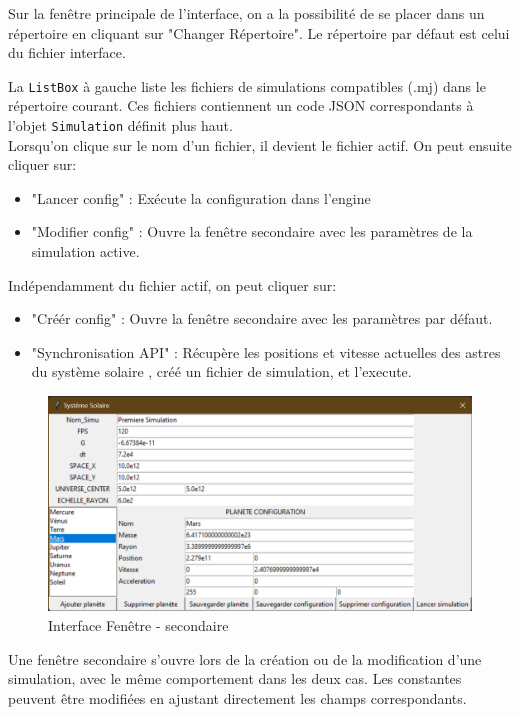 \documentclass[a4paper, 12pt]{article}
\begin{document}
    Sur la fenêtre principale de l'interface, on a la possibilité de se placer dans un répertoire en cliquant sur "Changer Répertoire". Le répertoire par défaut est celui du fichier interface. 

    La \texttt{ListBox} à gauche liste les fichiers de simulations compatibles (.mj) dans le répertoire courant. Ces fichiers contiennent un code JSON correspondants à l'objet \texttt{Simulation} définit plus haut. \\

    Lorsqu'on clique sur le nom d'un fichier, il devient le fichier actif. On peut ensuite cliquer sur:

    \begin{itemize}
        \item "Lancer config" : Exécute la configuration dans l'engine
        \item "Modifier config" : Ouvre la fenêtre secondaire avec les paramètres de la simulation active. \\
    \end{itemize}

    Indépendamment du fichier actif, on peut cliquer sur:

    \begin{itemize}
        \item "Créér config" : Ouvre la fenêtre secondaire avec les paramètres par défaut.
        \item "Synchronisation API" : Récupère les positions et vitesse actuelles des astres du système solaire , créé un fichier de simulation, et l'execute.
    \end{itemize}

    \begin{figure}[H]
		\centering
		\includegraphics[width=0.4\linewidth]{img/interfaceFenetreSecondaire.png}
		\caption{\label{fig: IntSec} Interface Fenêtre - secondaire}  
	\end{figure}

    Une fenêtre secondaire s'ouvre lors de la création ou de la modification d'une simulation, avec le même comportement dans les deux cas. Les constantes peuvent être modifiées en ajustant directement les champs correspondants. 
    
\end{document}
